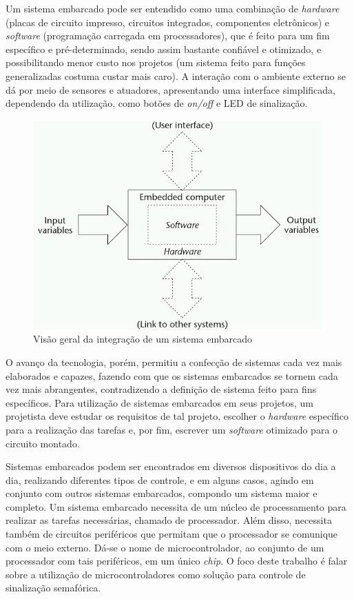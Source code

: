 Um sistema embarcado pode ser entendido como uma combinação de \textit{hardware} (placas de circuito impresso, circuitos integrados, componentes eletrônicos) e \textit{software} (programação carregada em processadores), que é feito para um fim específico e pré-determinado, sendo assim bastante confiável e otimizado, e possibilitando menor custo nos projetos (um sistema feito para funções generalizadas costuma custar mais caro). A interação com o ambiente externo se dá por meio de sensores e atuadores, apresentando uma interface simplificada, dependendo da utilização, como botões de \textit{on/off} e \ac{LED} de sinalização. 

\begin{figure}[ht]
    \begin{center}
    \includegraphics{figuras/embedded.PNG}
    \end{center}
    \caption[]{Visão geral da integração de um sistema embarcado}
    \label{embarcado}
\end{figure}

O avanço da tecnologia, porém, permitiu a confecção de sistemas cada vez mais elaborados e capazes, fazendo com que os sistemas embarcados se tornem cada vez mais abrangentes, contradizendo a definição de sistema feito para fins específicos. Para utilização de sistemas embarcados em seus projetos, um projetista deve estudar os requisitos de tal projeto, escolher o \textit{hardware} específico para a realização das tarefas e, por fim, escrever um \textit{software} otimizado para o circuito montado. %

Sistemas embarcados podem ser encontrados em diversos dispositivos do dia a dia, realizando diferentes tipos de controle, e em alguns casos, agindo em conjunto com outros sistemas embarcados, compondo um sistema maior e completo.
Um sistema embarcado necessita de um núcleo de processamento para realizar as tarefas necessárias, chamado de processador. Além disso, necessita também de circuitos periféricos que permitam que o processador se comunique com o meio externo. Dá-se o nome de microcontrolador, ao conjunto de um processador com tais periféricos, em um único \textit{chip}.
O foco deste trabalho é falar sobre a utilização de microcontroladores como solução para controle de sinalização semafórica. 

